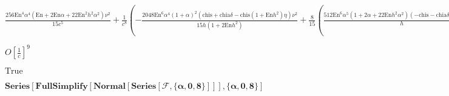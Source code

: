 \documentclass{article}
\begin{document}
\begin{doublespace}
\noindent\(\frac{256 \text{En}^4 \alpha ^4 \left(\text{En}+2 \text{En} \alpha +22 \text{En}^2 h^2 \alpha ^2\right) \nu ^2}{15 c^5}+\frac{1}{c^8}\left(-\frac{2048
\text{En}^6 \alpha ^4 (1+\alpha )^2 \left(\text{chis}+\text{chia} \delta -\text{chis} \left(1+\text{En} h^2\right) \eta \right) \nu ^2}{15 h \left(1+2
\text{En} h^2\right)}+\frac{8}{15} \left(\frac{512 \text{En}^6 \alpha ^5 \left(1+2 \alpha +22 \text{En} h^2 \alpha ^2\right) (-\text{chis}-\text{chia}
\delta +\text{chis} \eta ) \nu ^2}{h}+16 \text{En}^4 \alpha ^4 \nu ^2 \left(-16 \text{En}^{3/2} \sqrt{\text{En} h^2} \alpha ^2 \left(-4 \text{En}-10
\text{En} \alpha +51 \text{En}^2 h^2 \alpha ^2\right) \delta  (-\text{chia}+\text{chis} \delta )+\frac{176 \text{En}^2 \alpha ^2 \left(-1+\frac{(1+\alpha
)^2}{\left(1+2 \text{En} h^2\right) \alpha ^2}\right) \left(-\text{chis}-\text{chia} \delta +\text{chis} \eta +\text{chis} \text{En} h^2 \eta \right)}{h}+12
\left(-32 \text{En}^3 h \alpha ^3 (-\text{chis}-\text{chia} \delta +\text{chis} \eta )-\frac{16 \text{En}^2 \alpha ^2 \left(-1+\frac{(1+\alpha )^2}{\left(1+2
\text{En} h^2\right) \alpha ^2}\right) \left(-\text{chis}-\text{chia} \delta +\text{chis} \eta +\text{chis} \text{En} h^2 \eta \right)}{h}+\frac{16
\text{En}^2 \alpha ^2 \left(-2 \text{chis} \text{En} h^2 \alpha -2 \text{chia} \text{En} h^2 \alpha  \delta -\text{chis} \eta -\text{chis} \text{En}
h^2 \eta +2 \text{chis} \text{En} h^2 \alpha  \eta \right)}{h}\right)-16 \text{En}^{3/2} \sqrt{\text{En} h^2} \alpha ^2 \left(\text{En}+6 \text{En}
\alpha +78 \text{En}^2 h^2 \alpha ^2\right) (\text{chis}+\text{chia} \delta -2 \text{chis} \nu )\right)\right)\right)+O\left[\frac{1}{c}\right]^9\)
\end{doublespace}

\begin{doublespace}
\noindent\(O\left[\frac{1}{c}\right]^9\)
\end{doublespace}

\begin{doublespace}
\noindent\(\text{True}\)
\end{doublespace}

\begin{doublespace}
\noindent\(\pmb{\text{Series}[\text{FullSimplify}[\text{Normal}[\text{Series}[\mathcal{F},\{\alpha ,0,8\}]]],\{\alpha ,0,8\}]}\)
\end{doublespace}
\end{document}
